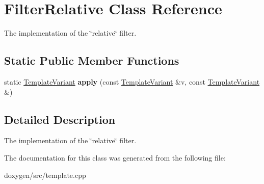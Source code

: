 \hypertarget{class_filter_relative}{}\section{Filter\+Relative Class Reference}
\label{class_filter_relative}


The implementation of the \char`\"{}relative\char`\"{} filter.  


\subsection*{Static Public Member Functions}
\begin{DoxyCompactItemize}
\item 
\mbox{\label{class_filter_relative_a2502b8e24f65501fa1b8af0d258a86e0}} 
static \mbox{\hyperlink{class_template_variant}{Template\+Variant}} {\bfseries apply} (const \mbox{\hyperlink{class_template_variant}{Template\+Variant}} \&v, const \mbox{\hyperlink{class_template_variant}{Template\+Variant}} \&)
\end{DoxyCompactItemize}


\subsection{Detailed Description}
The implementation of the \char`\"{}relative\char`\"{} filter. 

The documentation for this class was generated from the following file\+:\begin{DoxyCompactItemize}
\item 
doxygen/src/template.\+cpp\end{DoxyCompactItemize}
